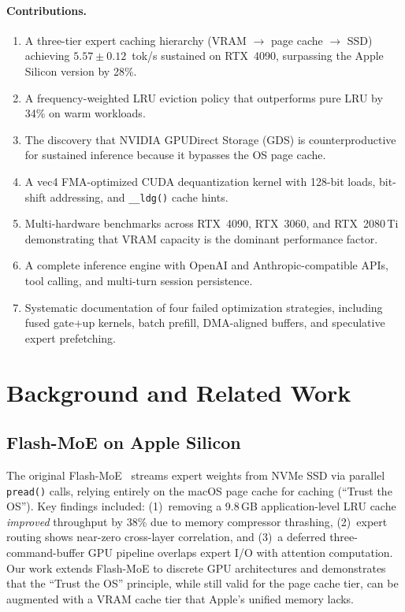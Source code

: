 \documentclass[10pt]{article}
\begin{document}
\paragraph{Contributions.}
\begin{enumerate}[nosep]
    \item A three-tier expert caching hierarchy (VRAM $\to$ page cache $\to$ SSD) achieving $5.57 \pm 0.12$~tok/s sustained on RTX~4090, surpassing the Apple Silicon version by 28\%.
    \item A frequency-weighted LRU eviction policy that outperforms pure LRU by 34\% on warm workloads.
    \item The discovery that NVIDIA GPUDirect Storage (GDS) is counterproductive for sustained inference because it bypasses the OS page cache.
    \item A vec4 FMA-optimized CUDA dequantization kernel with 128-bit loads, bit-shift addressing, and \texttt{\_\_ldg()} cache hints.
    \item Multi-hardware benchmarks across RTX~4090, RTX~3060, and RTX~2080\,Ti demonstrating that VRAM capacity is the dominant performance factor.
    \item A complete inference engine with OpenAI and Anthropic-compatible APIs, tool calling, and multi-turn session persistence.
    \item Systematic documentation of four failed optimization strategies, including fused gate+up kernels, batch prefill, DMA-aligned buffers, and speculative expert prefetching.
\end{enumerate}

\section{Background and Related Work}

\subsection{Flash-MoE on Apple Silicon}

The original Flash-MoE~\citep{flashmoe} streams expert weights from NVMe SSD via parallel \texttt{pread()} calls, relying entirely on the macOS page cache for caching (``Trust the OS''). Key findings included: (1)~removing a 9.8\,GB application-level LRU cache \emph{improved} throughput by 38\% due to memory compressor thrashing, (2)~expert routing shows near-zero cross-layer correlation, and (3)~a deferred three-command-buffer GPU pipeline overlaps expert I/O with attention computation. Our work extends Flash-MoE to discrete GPU architectures and demonstrates that the ``Trust the OS'' principle, while still valid for the page cache tier, can be augmented with a VRAM cache tier that Apple's unified memory lacks.
\end{document}
